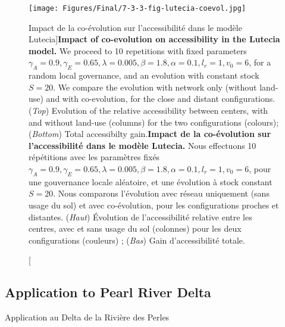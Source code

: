 \begin{figure}
	\texttt{[image: Figures/Final/7-3-3-fig-lutecia-coevol.jpg]}
	\caption[Impact of co-evolution on accessibility in the Lutecia model][Impact de la co-évolution sur l'accessibilité dans le modèle Lutecia]{\textbf{Impact of co-evolution on accessibility in the Lutecia model.} We proceed to 10 repetitions with fixed parameters $\gamma_A = 0.9, \gamma_E = 0.65, \lambda = 0.005, \beta = 1.8, \alpha = 0.1, l_r = 1, v_0 = 6$, for a random local governance, and an evolution with constant stock $S=20$. We compare the evolution with network only (without land-use) and with co-evolution, for the close and distant configurations. (\textit{Top}) Evolution of the relative accessibility between centers, with and without land-use (columns) for the two configurations (colours); (\textit{Bottom}) Total accessibilty gain.\label{fig:lutecia:coevol}}{\textbf{Impact de la co-évolution sur l'accessibilité dans le modèle Lutecia.} Nous effectuons 10 répétitions avec les paramètres fixés $\gamma_A = 0.9, \gamma_E = 0.65, \lambda = 0.005, \beta = 1.8, \alpha = 0.1, l_r = 1, v_0 = 6$, pour une gouvernance locale aléatoire, et une évolution à stock constant $S=20$. Nous comparons l'évolution avec réseau uniquement (sans usage du sol) et avec co-évolution, pour les configurations proches et distantes. (\textit{Haut}) Évolution de l'accessibilité relative entre les centres, avec et sans usage du sol (colonnes) pour les deux configurations (couleurs) ; (\textit{Bas}) Gain d'accessibilité totale.\label{fig:lutecia:coevol}}
\end{figure}





\subsection{Application to Pearl River Delta}{Application au Delta de la Rivière des Perles}








